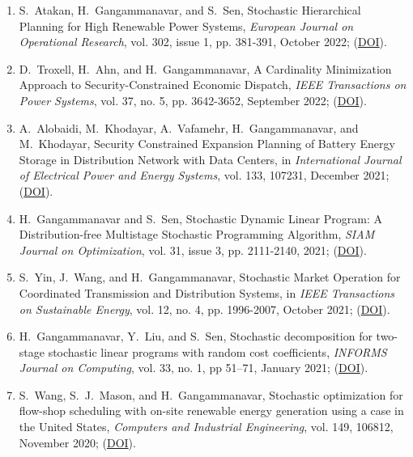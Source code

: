 \documentclass[hyperref, margin]{myResume}
\begin{document}
\begin{resume}
\begin{enumerate}[label=J\arabic*., leftmargin=*]
	\item S.\ Atakan, H.\ Gangammanavar, and S.\ Sen, Stochastic Hierarchical Planning for High Renewable Power Systems, \textit{European Journal on Operational Research}, vol. 302, issue 1, pp. 381-391, October 2022; (\href{https://doi.org/10.1016/j.ejor.2021.12.042}{DOI}).
	
	\item D.\ Troxell\footnotemark[2], H.\ Ahn, and H.\ Gangammanavar, A Cardinality Minimization Approach to Security-Constrained Economic Dispatch, \textit{IEEE Transactions on Power Systems}, vol. 37, no. 5, pp. 3642-3652, September 2022; (\href{https://doi.org/10.1109/TPWRS.2021.3133379}{DOI}).

	\item A.\ Alobaidi\footnotemark[3], M.\ Khodayar, A.\ Vafamehr, H.\ Gangammanavar, and M.\ Khodayar, Security Constrained Expansion Planning of Battery Energy Storage in Distribution Network with Data Centers, in \textit{International Journal of Electrical Power and Energy Systems}, vol. 133, 107231, December 2021; (\href{https://doi.org/10.1016/j.ijepes.2021.107231}{DOI}).

	\item H.\ Gangammanavar and S.\ Sen, Stochastic Dynamic Linear Program: A Distribution-free Multistage Stochastic Programming Algorithm, \textit{SIAM Journal on Optimization}, vol. 31, issue 3, pp. 2111-2140, 2021; (\href{https://doi.org/10.1137/19M1290735}{DOI}).

	\item S.\ Yin\footnotemark[3], J.\ Wang, and H.\ Gangammanavar, Stochastic Market Operation for Coordinated Transmission and Distribution Systems, in \textit{IEEE Transactions on Sustainable Energy}, vol. 12, no. 4, pp. 1996-2007, October 2021; (\href{https://doi.org/10.1109/TSTE.2021.3076037}{DOI}).

	\item H.\ Gangammanavar, Y.\ Liu, and S.\ Sen, Stochastic decomposition for two-stage stochastic linear programs with random cost coefficients, \textit{INFORMS Journal on Computing}, vol. 33, no. 1, pp 51–71, January 2021; (\href{https://doi.org/10.1287/ijoc.2019.0929}{DOI}).

	\item S.\ Wang\footnotemark[3], S.\ J.\ Mason, and H.\ Gangammanavar, Stochastic optimization for flow-shop scheduling with on-site renewable energy generation using a case in the United States, \textit{Computers and Industrial Engineering}, vol. 149, 106812, November 2020; (\href{https://doi.org/10.1016/j.cie.2020.106812}{DOI}).


\end{enumerate}
\end{resume}
\end{document}
